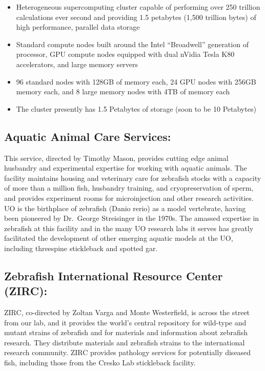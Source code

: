 \documentclass[
]{book}
\providecommand{\tightlist}{%
  \setlength{\itemsep}{0pt}\setlength{\parskip}{0pt}}
\begin{document}
\begin{itemize}
\tightlist
\item
  Heterogeneous supercomputing cluster capable of performing over 250 trillion calculations ever second and providing 1.5 petabytes (1,500 trillion bytes) of high performance, parallel data storage
\item
  Standard compute nodes built around the Intel ``Broadwell'' generation of processor, GPU compute nodes equipped with dual nVidia Tesla K80 accelerators, and large memory servers
\item
  96 standard nodes with 128GB of memory each, 24 GPU nodes with 256GB memory each, and 8 large memory nodes with 4TB of memory each
\item
  The cluster presently has 1.5 Petabytes of storage (soon to be 10 Petabytes)
\end{itemize}

\hypertarget{aquatic-animal-care-services}{%
\subsection{Aquatic Animal Care Services:}\label{aquatic-animal-care-services}}

This service, directed by Timothy Mason, provides cutting edge animal husbandry and experimental expertise for working with aquatic animals. The facility maintains housing and veterinary care for zebrafish stocks with a capacity of more than a million fish, husbandry training, and cryopreservation of sperm, and provides experiment rooms for microinjection and other research activities. UO is the birthplace of zebrafish (Danio rerio) as a model vertebrate, having been pioneered by Dr.~George Streisinger in the 1970s. The amassed expertise in zebrafish at this facility and in the many UO research labs it serves has greatly facilitated the development of other emerging aquatic models at the UO, including threespine stickleback and spotted gar.

\hypertarget{zebrafish-international-resource-center-zirc}{%
\subsection{Zebrafish International Resource Center (ZIRC):}\label{zebrafish-international-resource-center-zirc}}

ZIRC, co-directed by Zoltan Varga and Monte Westerfield, is across the street from our lab, and it provides the world's central repository for wild-type and mutant strains of zebrafish and for materials and information about zebrafish research. They distribute materials and zebrafish strains to the international research community. ZIRC provides pathology services for potentially diseased fish, including those from the Cresko Lab stickleback facility.
\end{document}
